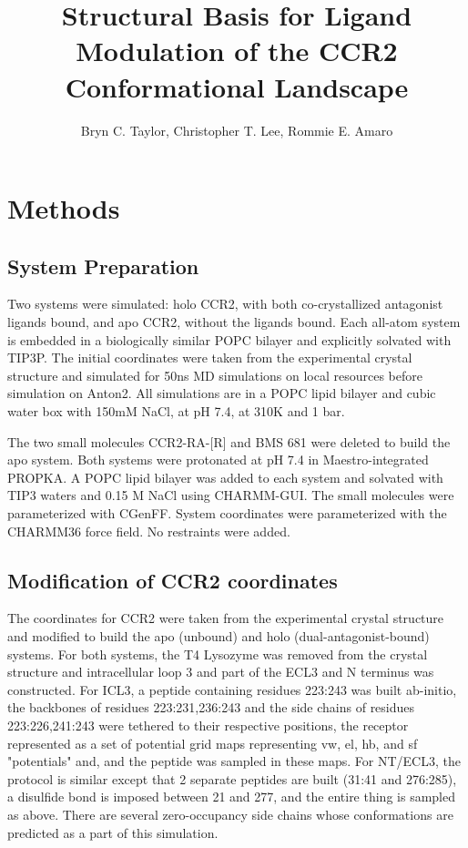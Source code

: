 \documentclass[9pt,twoside]{pnas-new}
\title{Structural Basis for Ligand Modulation of the CCR2 Conformational Landscape}
\author{Bryn C. Taylor, Christopher T. Lee, Rommie E. Amaro}
\begin{document}
\maketitle
\SItext

\section*{Methods}
\subsection*{System Preparation}
Two systems were simulated: holo CCR2, with both co-crystallized antagonist ligands bound, and apo CCR2, without the ligands bound. Each all-atom system is embedded in a biologically similar POPC bilayer and explicitly solvated with TIP3P. The initial coordinates were taken from the experimental crystal structure\cite{Zheng2016} and simulated for 50ns MD simulations on local resources before simulation on Anton2. All simulations are in a POPC lipid bilayer and cubic water box with 150mM NaCl, at pH 7.4, at 310K and 1 bar.

The two small molecules CCR2-RA-[R]\cite{Zheng2016,Dasse2007} and BMS 681\cite{Zheng2016,Carter2015} were deleted to build the apo system. Both systems were protonated at pH 7.4 in Maestro-integrated PROPKA. A POPC lipid bilayer was added to each system and solvated with TIP3 waters and 0.15 M NaCl using CHARMM-GUI\cite{Jo2008}. The small molecules were parameterized with CGenFF\cite{Vanommeslaeghe2010}. System coordinates were parameterized with the CHARMM36\cite{Huang2013} force field. No restraints were added.

\subsection*{Modification of CCR2 coordinates}
The coordinates for CCR2 were taken from the experimental crystal structure \cite{Zheng2016} and modified to build the apo (unbound) and holo (dual-antagonist-bound) systems. For both systems, the T4 Lysozyme was removed from the crystal structure and intracellular loop 3 and part of the ECL3 and N terminus was constructed. For ICL3, a peptide containing residues 223:243 was built ab-initio, the backbones of residues 223:231,236:243 and the side chains of residues 223:226,241:243 were tethered to their respective positions, the receptor represented as a set of potential grid maps representing vw, el, hb, and sf "potentials" and, and the peptide was sampled in these maps. For NT/ECL3, the protocol is similar except that 2 separate peptides are built (31:41 and 276:285), a disulfide bond is imposed between 21 and 277, and the entire thing is sampled as above. There are several zero-occupancy side chains whose conformations are predicted as a part of this simulation.
\end{document}
